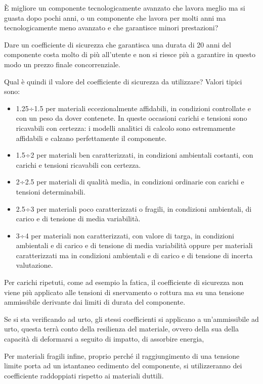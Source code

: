 \documentclass{article}
\begin{document}
\begin{adjustwidth}{2in}{}
\begin{enumerate}
	    	È migliore un componente tecnologicamente avanzato che lavora meglio ma si guasta dopo pochi anni, o un componente che lavora per molti anni ma tecnologicamente meno avanzato e che garantisce minori prestazioni?
	    	
	    	Dare un coefficiente di sicurezza che garantisca una durata di 20 anni del componente costa molto di più all'utente e non si riesce più a garantire in questo modo un prezzo finale concorrenziale.
	    \end{enumerate}
\newpage
	    Qual è  quindi il valore del coefficiente di sicurezza da utilizzare? Valori tipici sono:
	     \begin{itemize}
	     	\item 1.25÷1.5 per materiali eccezionalmente affidabili, in condizioni controllate e con un peso da dover contenete. In queste occasioni carichi e tensioni sono ricavabili con
	     	certezza: i modelli analitici di calcolo sono estremamente affidabili e calzano perfettamente il componente. 
	     	\item 1.5÷2 per materiali ben caratterizzati, in condizioni ambientali costanti, con carichi e tensioni ricavabili con
	     	certezza.
	     	\item 2÷2.5 per materiali di qualità media, in condizioni ordinarie con carichi e tensioni determinabili.
	     	\item 2.5÷3 per materiali poco caratterizzati o fragili, in condizioni ambientali, di carico e di tensione di
	     	media variabilità.
	     	\item 3÷4 per materiali non caratterizzati, con valore di targa, in condizioni ambientali e di carico e di tensione di media variabilità
	     	oppure per materiali caratterizzati ma in condizioni ambientali e di carico e di tensione di incerta valutazione.
	     \end{itemize}
     		
     	Per carichi ripetuti, come ad esempio la fatica, il coefficiente di sicurezza non viene più applicato alle tensioni di snervamento o rottura ma su una tensione ammissibile derivante dai limiti di durata del componente. 
     	
     	Se si sta verificando ad urto, gli stessi coefficienti si applicano a un'ammissibile ad urto, questa terrà conto della resilienza del materiale, ovvero della sua della capacità di deformarsi a seguito di impatto, di assorbire energia, 
     	
     	Per materiali fragili infine, proprio perché il raggiungimento di una tensione limite porta ad un istantaneo cedimento del componente, si utilizzeranno dei coefficiente raddoppiati rispetto ai materiali duttili. \newline 
     	

\end{adjustwidth}
\end{document}
